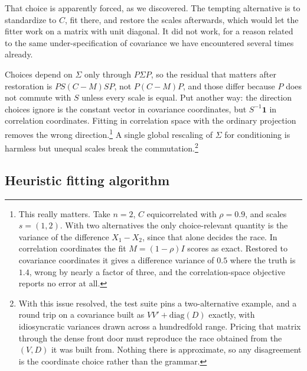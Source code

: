 \documentclass[11pt]{article}
\begin{document}
That choice is apparently forced, as we discovered. The tempting
alternative is to standardize to $C$,
fit there, and restore the scales afterwards, which would let the fitter
work on a matrix with unit diagonal. It did not work, for a reason related to the same under-specification of covariance we have encountered several times already.

Choices depend on $\Sigma$ only through $P\Sigma P$, so
the residual that matters after restoration is $PS(C-M)SP$, not
$P(C-M)P$, and those differ because $P$ does not commute with $S$ unless
every scale is equal. Put another way: the direction choices ignore is
the constant vector in covariance coordinates, but $S^{-1}\mathbf{1}$ in
correlation coordinates. Fitting in correlation space with the ordinary
projection removes the wrong direction.\footnote{This really matters. Take $n=2$, $C$ equicorrelated with $\rho=0.9$, and
scales $s=(1,2)$. With two alternatives the only choice-relevant
quantity is the variance of the difference $X_1-X_2$, since that alone
decides the race. In correlation coordinates the fit $M=(1-\rho)I$ scores as exact.
Restored to covariance coordinates it gives a difference variance of
$0.5$ where the truth is $1.4$, wrong by nearly a factor of three, and
the correlation-space objective reports no error at all.} A single global rescaling of $\Sigma$ for conditioning is harmless but
unequal scales break the commutation.\footnote{With this issue resolved, the test suite pins a two-alternative example, and a round trip on a covariance built as
$VV'+\mathrm{diag}(D)$ exactly, with idiosyncratic variances drawn across
a hundredfold range. Pricing that matrix through the dense front door
must reproduce the race obtained from the $(V,D)$ it was built from.
Nothing there is approximate, so any disagreement is the coordinate
choice rather than the grammar.}

\subsection{Heuristic fitting algorithm}
\end{document}
